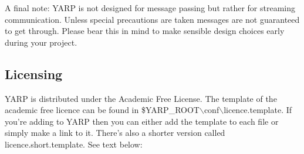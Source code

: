 A final note: YARP is not designed for message passing but rather for streaming communication. Unless special precautions are taken messages are not guaranteed to get through. Please bear this in mind to make sensible design choices early during your project.

\subsection{Licensing}
YARP is distributed under the Academic Free License. The template of the academic
free licence can be found in \$YARP\_ROOT$\backslash$conf$\backslash$licence.template. If you're adding to YARP then you can either add the template to each file or simply make a link to it. There's also a shorter version called licence.short.template. See text below:

